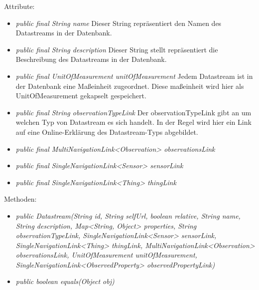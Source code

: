 Attribute:
\begin{itemize}
    \item \emph{public final String name} Dieser String repräsentiert den Namen des Datastreams in der Datenbank.
    \item \emph{public final String description} Dieser String stellt repräsentiert die Beschreibung des Datastreams in der Datenbank.
    \item \emph{public final UnitOfMeasurement unitOfMeasurement} Jedem Datastream ist in der Datenbank eine Maßeinheit zugeordnet. Diese maßeinheit wird hier als UnitOfMeasurement gekapselt gespeichert.
    \item \emph{public final String observationTypeLink} Der observationTypeLink gibt an um welchen Typ von Datastream es sich handelt.
    In der Regel wird hier ein Link auf eine Online-Erklärung des Datastream-Typs abgebildet.
    \item \emph{public final MultiNavigationLink<Observation> observationsLink} 
    \item \emph{public final SingleNavigationLink<Sensor> sensorLink} 
    \item \emph{public final SingleNavigationLink<Thing> thingLink} 
\end{itemize}
Methoden: \begin{itemize}
    \item \emph{public Datastream(String id, String selfUrl, boolean relative, String name, String description, Map<String, Object> properties, String observationTypeLink, SingleNavigationLink<Sensor> sensorLink, SingleNavigationLink<Thing> thingLink, MultiNavigationLink<Observation> observationsLink, UnitOfMeasurement unitOfMeasurement, SingleNavigationLink<ObservedProperty> observedPropertyLink)}
    \item \emph{public boolean equals(Object obj)} 
\end{itemize}

